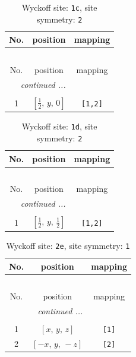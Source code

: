 \documentclass[fleqn,8pt]{jsarticle}
\begin{document}
\begin{longtable}{ccc}
\caption{Wyckoff site: {\tt 1c}, site symmetry: {\tt 2}}
 \\
 \hline \hline
No. & position & mapping \\ \hline \endfirsthead

\multicolumn{2}{l}{\tablename\ \thetable{}} \\
 \hline \hline
No. & position & mapping \\ \hline \endhead

 \hline \hline
\multicolumn{2}{r}{\footnotesize\it continued ...} \\ \endfoot

 \hline \hline
\multicolumn{2}{r}{} \\ \endlastfoot

1 & $\left[ \frac{1}{2},\, y,\, 0 \right]$ & {\tt [1,2]} \\
\end{longtable}
\renewcommand{\arraystretch}{1.2}
\begin{longtable}{ccc}
\caption{Wyckoff site: {\tt 1d}, site symmetry: {\tt 2}}
 \\
 \hline \hline
No. & position & mapping \\ \hline \endfirsthead

\multicolumn{2}{l}{\tablename\ \thetable{}} \\
 \hline \hline
No. & position & mapping \\ \hline \endhead

 \hline \hline
\multicolumn{2}{r}{\footnotesize\it continued ...} \\ \endfoot

 \hline \hline
\multicolumn{2}{r}{} \\ \endlastfoot

1 & $\left[ \frac{1}{2},\, y,\, \frac{1}{2} \right]$ & {\tt [1,2]} \\
\end{longtable}
\renewcommand{\arraystretch}{1.2}
\begin{longtable}{ccc}
\caption{Wyckoff site: {\tt 2e}, site symmetry: {\tt 1}}
 \\
 \hline \hline
No. & position & mapping \\ \hline \endfirsthead

\multicolumn{2}{l}{\tablename\ \thetable{}} \\
 \hline \hline
No. & position & mapping \\ \hline \endhead

 \hline \hline
\multicolumn{2}{r}{\footnotesize\it continued ...} \\ \endfoot

 \hline \hline
\multicolumn{2}{r}{} \\ \endlastfoot

1 & $\left[ x,\, y,\, z \right]$ & {\tt [1]} \\ \hline
2 & $\left[ - x,\, y,\, - z \right]$ & {\tt [2]} \\
\end{longtable}
\end{document}
